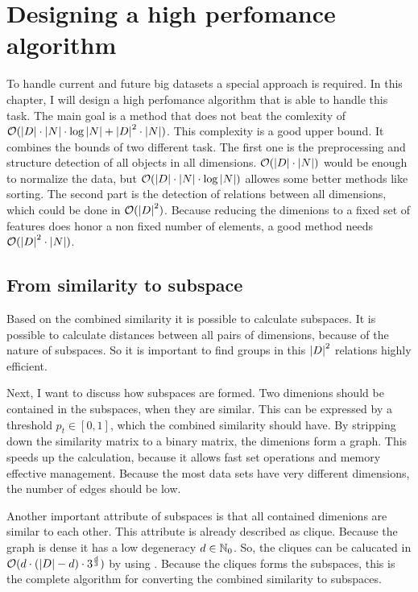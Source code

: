 \chapter{Designing a high perfomance algorithm}\label{chap:algodesign}
To handle current and future big datasets a special approach is required. In this chapter, I will design a high perfomance algorithm that is able to handle this task. The main goal is a method that does not beat the comlexity of $\mathcal{O} ( \left|D\right| \cdot \left|N\right| \cdot \log{\left|N\right|} + \left|D\right|^2 \cdot \left|N\right| )$. This complexity is a good upper bound. It combines the bounds of two different task. The first one is the preprocessing and structure detection of all objects in all dimensions. $\mathcal{O} ( \left|D\right| \cdot \left|N\right| )$ would be enough to normalize the data, but $\mathcal{O} ( \left|D\right| \cdot \left|N\right| \cdot \log{\left|N\right|} )$ allowes some better methods like sorting. The second part is the detection of relations between all dimensions, which could be done in $\mathcal{O} ( \left|D\right|^2 )$. Because reducing the dimenions to a fixed set of features does honor a non fixed number of elements, a good method needs $\mathcal{O} ( \left|D\right|^2 \cdot \left|N\right| )$.

\section{From similarity to subspace}
Based on the combined similarity it is possible to calculate subspaces. It is possible to calculate distances between all pairs of dimensions, because of the nature of subspaces. So it is important to find groups in this $\left|D\right|^2$ relations highly efficient.

Next, I want to discuss how subspaces are formed. Two dimenions should be contained in the subspaces, when they are similar. This can be expressed by a threshold $p_t \in [0,1]$, which the combined similarity should have. By stripping down the similarity matrix to a binary matrix, the dimenions form a graph. This speeds up the calculation, because it allows fast set operations and memory effective management. Because the most data sets have very different dimensions, the number of edges should be low.

Another important attribute of subspaces is that all contained dimenions are similar to each other. This attribute is already described as clique. Because the graph is dense it has a low degeneracy $d \in \mathbb{N}_0$. So, the cliques can be calucated in $\mathcal{O}(d \cdot (\left|D\right| - d) \cdot 3^{\frac{d}{3}})$ by using \cite{listingCliques}. Because the cliques forms the subspaces, this is the complete algorithm for converting the combined similarity to subspaces.

